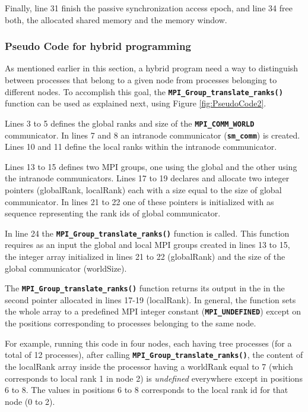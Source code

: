 Finally, line 31 finish the passive synchronization access epoch, and line 34 free both, the allocated shared memory and the memory window.


\subsubsection*{Pseudo Code for hybrid programming} \label{PseudoCodeForHybridProgramming}

As mentioned earlier in this section, a hybrid program need a way to distinguish between processes that belong to a given node from processes belonging to different nodes. To accomplish this goal, the \textbf{\texttt{MPI\_Group\_translate\_ranks()}} function can be used as explained next, using Figure \ref{fig:PseudoCode2}.
 

\medskip

Lines 3 to 5 defines the global ranks and size of the \textbf{\texttt{MPI\_COMM\_WORLD}} communicator. In lines 7 and 8 an intranode communicator (\textbf{\texttt{sm\_comm}}) is created. Lines 10 and 11 define the local ranks within the intranode communicator.

\medskip

Lines 13 to 15 defines two MPI groups, one using the global and the other using the intranode communicators. Lines 17 to 19 declares and allocate two integer pointers (globalRank, localRank) each with a size equal to the size of global communicator. In lines 21 to 22 one of these pointers is initialized with as sequence representing the rank ids of global communicator.

\medskip

In line 24 the \textbf{\texttt{MPI\_Group\_translate\_ranks()}} function is called. This function requires as an input the global and local MPI groups created in lines 13 to 15, the integer array initialized in lines 21 to 22 (globalRank) and the size of the global communicator (worldSize). 

\medskip

The \textbf{\texttt{MPI\_Group\_translate\_ranks()}} function returns its output in the in the second pointer allocated in lines 17-19 (localRank). In general, the function sets the whole array to a predefined MPI integer constant (\textbf{\texttt{MPI\_UNDEFINED}}) except on the positions corresponding to processes belonging to the same node. 

\medskip

For example, running this code in four nodes, each having tree processes (for a total of 12 processes), after calling \textbf{\texttt{MPI\_Group\_translate\_ranks()}}, the content of the localRank array inside the processor having a worldRank equal to 7 (which corresponds to local rank 1 in node 2) is \emph{undefined} everywhere except in positions 6 to 8. The values in positions 6 to 8 corresponds to the local rank id for that node (0 to 2).


